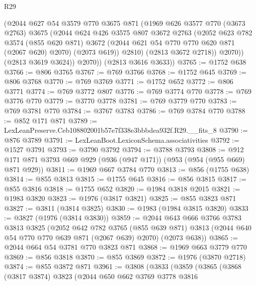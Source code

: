 \begin{lexlean}{R29}
\begin{coremodule}
              (@2044
                @627
                @54
                @3579
                @770
                @3675
                @871
                (@1969
                  @626
                  @3577
                  @770
                  (@3673 @2763)
                  @3675
                  (@2044
                    @624
                    @426
                    @3575
                    @807
                    @3672
                    @2763
                    (@2052
                      @623
                      @782
                      @3574
                      (@855 @620 @871)
                      @3672
                      (@2044 @621 @54 @770 @770 @620 @871 (@2067 @620) @2070)
                      (@2073 @619))
                    @2810)
                  (@2813 @3672 @2718))
                @2070))
            (@2813 @3619 @3624))
          @2070))
      (@2813 @3616 @3633))
@3765 := @1752 @638
@3766 := @806 @3765
@3767 := @769 @3766
@3768 := @1752 @645
@3769 := @806 @3768
@3770 := @769 @3769
@3771 := @1752 @652
@3772 := @806 @3771
@3774 := @769 @3772 @807
@3776 := @769 @3774 @770
@3778 := @769 @3776 @770
@3779 := @3770 @3778
@3781 := @769 @3779 @770
@3783 := @769 @3781 @770
@3784 := @3767 @3783
@3786 := @769 @3784 @770
@3788 := @852 @171 @871
@3789 := LexLeanPreserve.Ceb108802001b57e7f338e3bbbdea932f.R29.__fits_8
@3790 := @876 @3789
@3791 := LexLeanBoot.LexiconSchema.associativities
@3792 := @1527 @3791
@3793 := @3790 @3792
@3794 := @3788 @3793
@3808 := @912 @171 @871 @3793 @669 @929 (@936 (@947 @171)) (@953 (@954 (@955 @669) @871 @929))
@3811 := @1969 @667 @3784 @770
@3813 := @856 (@1755 @638)
@3814 := @855 @3813
@3815 := @1755 @645
@3816 := @856 @3815
@3817 := @855 @3816
@3818 := @1755 @652
@3820 := @1984 @3818 @2015
@3821 := @1983 @3820
@3823 := @1976 (@3817 @3821)
@3825 := @855 @3823 @871
@3827 := @3811 (@3814 @3825)
@3830 := @1983 (@1984 @3815 @3820)
@3833 := @3827 (@1976 (@3814 @3830))
@3859 := @2044
    @643
    @666
    @3766
    @3783
    @3813
    @3825
    (@2052
      @642
      @782
      @3765
      (@855 @639 @871)
      @3813
      (@2044 @640 @54 @770 @770 @639 @871 (@2067 @639) @2070)
      (@2073 @638))
@3865 := @2044 @664 @54 @3781 @770 @3823 @871
@3868 := @1969 @663 @3779 @770
@3869 := @856 @3818
@3870 := @855 @3869
@3872 := @1976 (@3870 @2718)
@3874 := @855 @3872 @871
@3961 := @3808
    (@3833
      (@3859
        (@3865
          (@3868
            (@3817 @3874)
            @3823
            (@2044
              @650
              @662
              @3769
              @3778
              @3816

\end{coremodule}
\end{lexlean}
